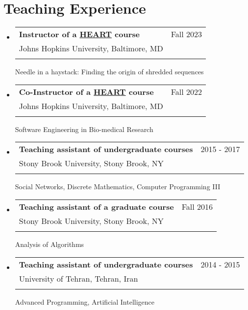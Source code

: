 \documentclass[A4,11pt]{article}
\makeatletter
\newcommand{\CVSubheading}[4]{
  \vspace{-2pt}\item
    \begin{tabular*}{0.97\textwidth}[t]{l@{\extracolsep{\fill}}r}
      \textbf{#1} & #2 \\
      \small#3 & \small #4 \\
    \end{tabular*}\vspace{-7pt}
}
\newcommand{\CVSubHeadingListStart}{\begin{itemize}[leftmargin=0.5cm, label={}]}
\newcommand{\CVSubHeadingListEnd}{\end{itemize}}
\makeatother
\begin{document}
\begin{comment}
    Section is here as it applied to my application for positions in academia. 
    Remember to tailor the resume for to the position.
\end{comment}
    \section{Teaching Experience}
      \CVSubHeadingListStart
      \CVSubheading
      {Instructor of a \href{https://engineering.jhu.edu/education/undergraduate-studies/heart-heroic-courses/}{HEART} course}{Fall 2023}
      {Johns Hopkins University, Baltimore, MD}\\
      {Needle in a haystack: Finding the origin of shredded sequences}
    
      \CVSubheading
      {Co-Instructor of a \href{https://engineering.jhu.edu/education/undergraduate-studies/heart-heroic-courses/}{HEART} course}{Fall 2022}
      {Johns Hopkins University, Baltimore, MD}\\
      {Software Engineering in Bio-medical Research}
    
      \CVSubheading
          {Teaching assistant of undergraduate courses}{2015 - 2017}
          {Stony Brook University, Stony Brook, NY} \\
          {Social Networks, Discrete Mathematics, Computer Programming III}
        \CVSubheading
          {Teaching assistant of a graduate course}{Fall 2016}
          {Stony Brook University, Stony Brook, NY}\\
          {Analysis of Algorithms}
        \CVSubheading
          {Teaching assistant of undergraduate courses}{2014 - 2015}
          {University of Tehran, Tehran, Iran}\\
          {Advanced Programming, Artificial Intelligence}
        \CVSubHeadingListEnd
      
    
        \nocite{*}
        
    
\end{document}
